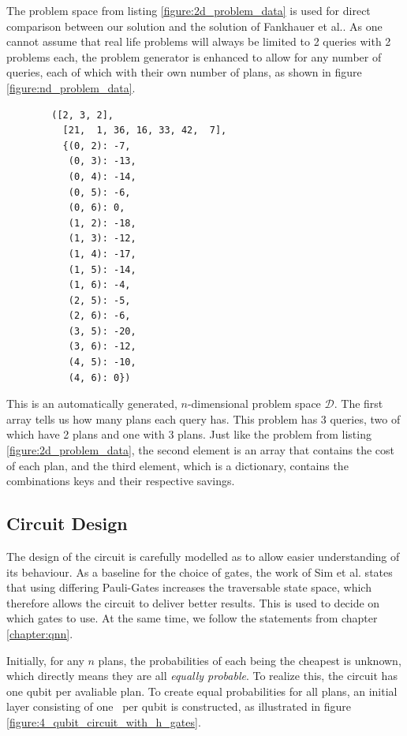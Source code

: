 \newpage

The problem space from listing \ref{figure:2d_problem_data} is used for direct comparison between our solution and the solution of Fankhauer et al.\cite{fankhauser_multiple_2021}. As one cannot assume that real life problems will always be limited to 2 queries with 2 problems each, the problem generator is enhanced to allow for any number of queries, each of which with their own number of plans, as shown in figure \ref{figure:nd_problem_data}.

\begin{listing}[!ht]
    \centering
    \begin{verbatim}
        ([2, 3, 2],
          [21,  1, 36, 16, 33, 42,  7],
          {(0, 2): -7,
           (0, 3): -13,
           (0, 4): -14,
           (0, 5): -6,
           (0, 6): 0,
           (1, 2): -18,
           (1, 3): -12,
           (1, 4): -17,
           (1, 5): -14,
           (1, 6): -4,
           (2, 5): -5,
           (2, 6): -6,
           (3, 5): -20,
           (3, 6): -12,
           (4, 5): -10,
           (4, 6): 0})
    \end{verbatim}
    \caption{This is an automatically generated, $n$-dimensional problem space $\mathcal{D}$. The first array tells us how many plans each query has. This problem has 3 queries, two of which have 2 plans and one with 3 plans. Just like the problem from listing \ref{figure:2d_problem_data}, the second element is an array that contains the cost of each plan, and the third element, which is a dictionary, contains the combinations keys and their respective savings.}
    \label{figure:nd_problem_data}
\end{listing}

\newpage

\subsection{Circuit Design}
\label{chapter:circuit_design}

The design of the circuit is carefully modelled as to allow easier understanding of its behaviour. As a baseline for the choice of gates, the work of Sim et al.\cite{sim_expressibility_2019} states that using differing Pauli-Gates increases the traversable state space, which therefore allows the circuit to deliver better results. This is used to decide on which gates to use. At the same time, we follow the statements from chapter \ref{chapter:qnn}. \par
Initially, for any $n$ plans, the probabilities of each being the cheapest is unknown, which directly means they are all \emph{equally probable}. To realize this, the circuit has one qubit per avaliable plan. To create equal probabilities for all plans, an initial layer consisting of one \hgate\ per qubit is constructed, as illustrated in figure \ref{figure:4_qubit_circuit_with_h_gates}.


